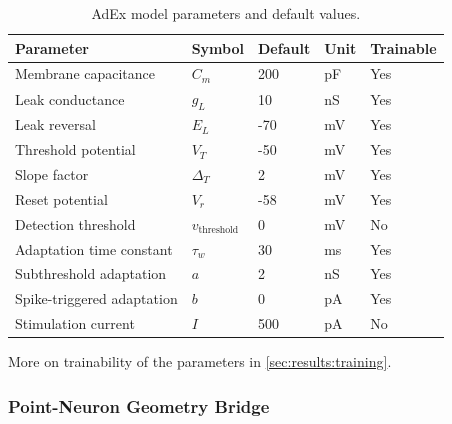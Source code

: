 \begin{table}[t]
\centering
\caption{\gls{AdEx} model parameters and default values.}
\label{tab:adex_params}
\begin{tabular}{lllll}
\toprule
\textbf{Parameter} & \textbf{Symbol} & \textbf{Default} & \textbf{Unit} & \textbf{Trainable} \\
\midrule
Membrane capacitance & $C_m$ & 200 & pF & Yes\\
Leak conductance & $g_L$ & 10 & nS & Yes\\
Leak reversal & $E_L$ & -70 & mV & Yes \\
Threshold potential & $V_T$ & -50 & mV & Yes\\
Slope factor & $\Delta_T$ & 2 & mV & Yes\\
Reset potential & $V_r$ & -58 & mV & Yes \\
Detection threshold & $v_{\text{threshold}}$ & 0 & mV & No \\
Adaptation time constant & $\tau_w$ & 30 & ms & Yes\footnotemark[2]\\
Subthreshold adaptation & $a$ & 2 & nS & Yes\footnotemark[2] \\
Spike-triggered adaptation & $b$ & 0 & pA & Yes\footnotemark[2] \\
Stimulation current & $I$ & 500 & pA & No \\
\bottomrule
\end{tabular}
\end{table}

More on trainability of the parameters in \cref{sec:results:training}.

\subsubsection{Point-Neuron Geometry Bridge}\label{sec:method:adex:geometry-bridge}

